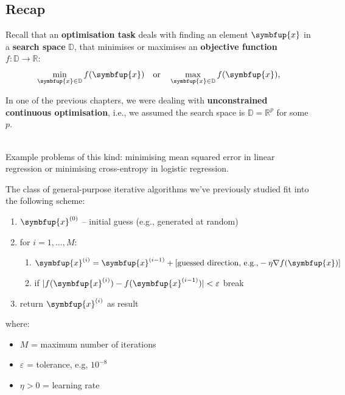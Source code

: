 \documentclass[10pt,b5paper,krantz1]{krantz}
\providecommand{\tightlist}{%
  \setlength{\itemsep}{0pt}\setlength{\parskip}{0pt}}
\renewcommand{\mathbf}[1]{\symbfup{#1}}
\begin{document}
\hypertarget{recap}{%
\subsection{Recap}\label{recap}}

Recall that an \textbf{optimisation task} deals with finding an element \(\mathbf{x}\)
in a \textbf{search space} \(\mathbb{D}\),
that minimises or maximises an \textbf{objective function} \(f:\mathbb{D}\to\mathbb{R}\):
\[
\min_{\mathbf{x}\in \mathbb{D}} f(\mathbf{x}) \quad\text{or}\quad\max_{\mathbf{x}\in \mathbb{D}} f(\mathbf{x}),
\]

In one of the previous chapters, we were dealing with
\textbf{unconstrained continuous optimisation},
i.e., we assumed the search space is \(\mathbb{D}=\mathbb{R}^p\) for some \(p\).

~\\

Example problems of this kind: minimising mean squared error
in linear regression
or minimising cross-entropy in logistic regression.

The class of general-purpose iterative algorithms we've previously studied
fit into the following scheme:

\begin{enumerate}
\def\labelenumi{\arabic{enumi}.}
\item
  \(\mathbf{x}^{(0)}\) -- initial guess (e.g., generated at random)
\item
  for \(i=1,...,M\):

  \begin{enumerate}
  \def\labelenumii{\alph{enumii}.}
  \tightlist
  \item
    \(\mathbf{x}^{(i)} = \mathbf{x}^{(i-1)}+\text{[guessed direction, e.g.,}-\eta\nabla f(\mathbf{x})\text{]}\)
  \item
    if \(|f(\mathbf{x}^{(i)})-f(\mathbf{x}^{(i-1)})| < \varepsilon\) break
  \end{enumerate}
\item
  return \(\mathbf{x}^{(i)}\) as result
\end{enumerate}

where:

\begin{itemize}
\tightlist
\item
  \(M\) = maximum number of iterations
\item
  \(\varepsilon\) = tolerance, e.g, \(10^{-8}\)
\item
  \(\eta>0\) = learning rate
\end{itemize}
\end{document}
